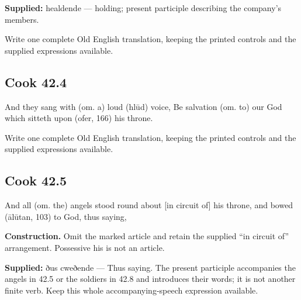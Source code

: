 \textbf{Supplied:} healdende — holding; present participle describing the company’s members.

Write one complete Old English translation, keeping the printed controls and the supplied expressions available.

\par\begin{minipage}{\linewidth}\raggedright
\subsection*{Cook 42.4}

And they sang with (om. a) loud (hlūd) voice, Be salvation (om. to) our God which sitteth upon (ofer, 166) his throne.

Write one complete Old English translation, keeping the printed controls and the supplied expressions available.

\end{minipage}\par\addvspace{4pt}

\par\begin{minipage}{\linewidth}\raggedright
\subsection*{Cook 42.5}

And all (om. the) angels stood round about [in circuit of] his throne, and bowed (ālūtan, 103) to God, thus saying,

\end{minipage}\par\addvspace{4pt}

\textbf{Construction.} Omit the marked article and retain the supplied “in circuit of” arrangement. Possessive his is not an article.

\textbf{Supplied:} ðus cweðende — Thus saying. The present participle accompanies the angels in 42.5 or the soldiers in 42.8 and introduces their words; it is not another finite verb. Keep this whole accompanying-speech expression available.

